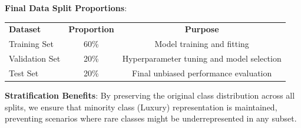 \documentclass[12pt, a4paper]{article}
\begin{document}
\textbf{Final Data Split Proportions}:
\begin{center}
\renewcommand{\arraystretch}{1.4}
\begin{tabular}{l c c}
  \rowcolor{slate}
  {\color{white}\small\bfseries Dataset} &
  {\color{white}\small\bfseries Proportion} &
  {\color{white}\small\bfseries Purpose} \\
  \rowcolor{lightgray} Training Set & 60\% & Model training and fitting \\
  \rowcolor{white} Validation Set & 20\% & Hyperparameter tuning and model selection \\
  \rowcolor{lightgray} Test Set & 20\% & Final unbiased performance evaluation \\
\end{tabular}
\end{center}

\textbf{Stratification Benefits}: By preserving the original class distribution across all splits, we ensure that minority class (Luxury) representation is maintained, preventing scenarios where rare classes might be underrepresented in any subset.

\newpage
\end{document}
